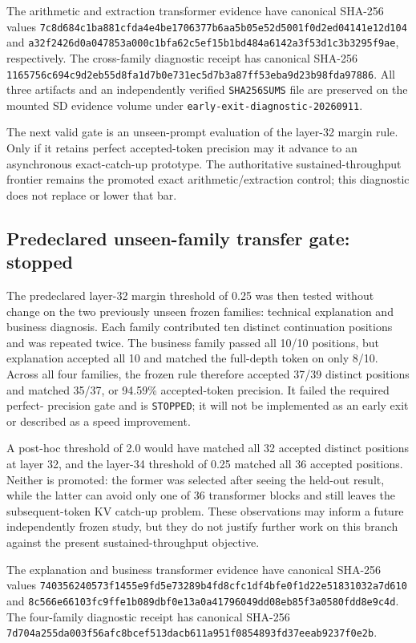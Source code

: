 The arithmetic and extraction transformer evidence have canonical SHA-256 values
\texttt{7c8d684c1ba881cfda4e4be1706377b6aa5b05e52d5001f0d2ed04141e12d104}
and
\texttt{a32f2426d0a047853a000c1bfa62c5ef15b1bd484a6142a3f53d1c3b3295f9ae},
respectively.  The cross-family diagnostic receipt has canonical SHA-256
\texttt{1165756c694c9d2eb55d8fa1d7b0e731ec5d7b3a87ff53eba9d23b98fda97886}.
All three artifacts and an independently verified \texttt{SHA256SUMS} file are
preserved on the mounted SD evidence volume under
\texttt{early-exit-diagnostic-20260911}.

The next valid gate is an unseen-prompt evaluation of the layer-32 margin rule.
Only if it retains perfect accepted-token precision may it advance to an
asynchronous exact-catch-up prototype.  The authoritative sustained-throughput
frontier remains the promoted exact arithmetic/extraction control; this
diagnostic does not replace or lower that bar.

\subsection{Predeclared unseen-family transfer gate: stopped}

The predeclared layer-32 margin threshold of 0.25 was then tested without change
on the two previously unseen frozen families: technical explanation and business
diagnosis.  Each family contributed ten distinct continuation positions and was
repeated twice.  The business family passed all 10/10 positions, but explanation
accepted all 10 and matched the full-depth token on only 8/10.  Across all four
families, the frozen rule therefore accepted 37/39 distinct positions and matched
35/37, or 94.59\% accepted-token precision.  It failed the required perfect-
precision gate and is \texttt{STOPPED}; it will not be implemented as an early
exit or described as a speed improvement.

A post-hoc threshold of 2.0 would have matched all 32 accepted distinct positions
at layer 32, and the layer-34 threshold of 0.25 matched all 36 accepted positions.
Neither is promoted: the former was selected after seeing the held-out result,
while the latter can avoid only one of 36 transformer blocks and still leaves the
subsequent-token KV catch-up problem.  These observations may inform a future
independently frozen study, but they do not justify further work on this branch
against the present sustained-throughput objective.

The explanation and business transformer evidence have canonical SHA-256 values
\texttt{740356240573f1455e9fd5e73289b4fd8cfc1df4bfe0f1d22e51831032a7d610}
and
\texttt{8c566e66103fc9ffe1b089dbf0e13a0a41796049dd08eb85f3a0580fdd8e9c4d}.
The four-family diagnostic receipt has canonical SHA-256
\texttt{7d704a255da003f56afc8bcef513dacb611a951f0854893fd37eeab9237f0e2b}.

